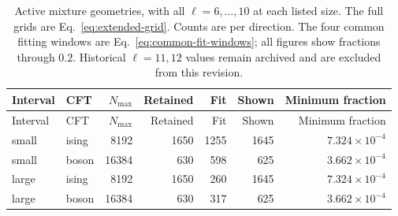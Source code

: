 \begin{longtable}{llrrrrr}
\caption{Active mixture geometries, with all $\ell=6,\ldots,10$ at each listed size. The full grids are Eq.~\eqref{eq:extended-grid}. Counts are per direction. The four common fitting windows are Eq.~\eqref{eq:common-fit-windows}; all figures show fractions through $0.2$. Historical $\ell=11,12$ values remain archived and are excluded from this revision.}
\label{tab:scaling-grid}\\\toprule
Interval & CFT & $N_{\max}$ & Retained & Fit & Shown & Minimum fraction\\\midrule
\endfirsthead
\toprule
Interval & CFT & $N_{\max}$ & Retained & Fit & Shown & Minimum fraction\\\midrule
\endhead
\bottomrule\endfoot
small & ising & 8192 & 1650 & 1255 & 1645 & $7.324\!\times\!10^{-4}$\\
small & boson & 16384 & 630 & 598 & 625 & $3.662\!\times\!10^{-4}$\\
large & ising & 8192 & 1650 & 260 & 1645 & $7.324\!\times\!10^{-4}$\\
large & boson & 16384 & 630 & 317 & 625 & $3.662\!\times\!10^{-4}$\\
\end{longtable}
